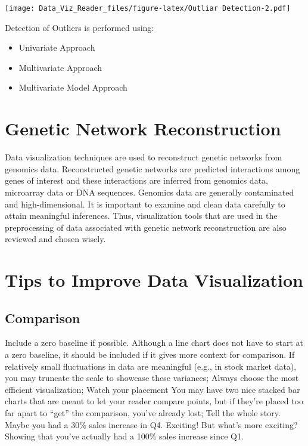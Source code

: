 \documentclass[]{book}
\providecommand{\tightlist}{%
  \setlength{\itemsep}{0pt}\setlength{\parskip}{0pt}}
\theoremstyle{definition}
\theoremstyle{definition}
\theoremstyle{definition}
\theoremstyle{remark}
\begin{document}
\texttt{[image: Data\_Viz\_Reader\_files/figure-latex/Outliar Detection-2.pdf]}

Detection of Outliers is performed using:

\begin{itemize}
\tightlist
\item
  Univariate Approach
\item
  Multivariate Approach
\item
  Multivariate Model Approach
\end{itemize}

\section{Genetic Network
Reconstruction}\label{genetic-network-reconstruction}

Data visualization techniques are used to reconstruct genetic networks
from genomics data. Reconstructed genetic networks are predicted
interactions among genes of interest and these interactions are inferred
from genomics data, microarray data or DNA sequences. Genomics data are
generally contaminated and high-dimensional. It is important to examine
and clean data carefully to attain meaningful inferences. Thus,
visualization tools that are used in the preprocessing of data
associated with genetic network reconstruction are also reviewed and
chosen wisely.

\section{Tips to Improve Data
Visualization}\label{tips-to-improve-data-visualization}

\citep{French} \citep{Steier}

\subsection{Comparison}\label{comparison}

Include a zero baseline if possible. Although a line chart does not have
to start at a zero baseline, it should be included if it gives more
context for comparison. If relatively small fluctuations in data are
meaningful (e.g., in stock market data), you may truncate the scale to
showcase these variances; Always choose the most efficient
visualization; Watch your placement You may have two nice stacked bar
charts that are meant to let your reader compare points, but if they're
placed too far apart to ``get'' the comparison, you've already lost;
Tell the whole story. Maybe you had a 30\% sales increase in Q4.
Exciting! But what's more exciting? Showing that you've actually had a
100\% sales increase since Q1.
\end{document}
